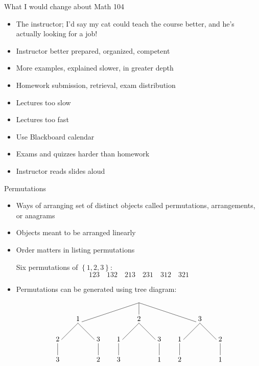 \documentclass[handout]{beamer}
\theoremstyle{definition}
\begin{document}
\begin{frame}{What I would change about Math 104}
\begin{itemize}
\item The instructor; I'd say my cat could teach the
course better, and he's actually looking for a job!
\item Instructor better prepared, organized, competent
\item More examples, explained slower, in greater depth
\item Homework submission, retrieval, exam distribution
\item Lectures too slow
\item Lectures too fast
\item Use Blackboard calendar
\item Exams and quizzes harder than homework
\item Instructor reads slides aloud
\end{itemize}
\end{frame}

\begin{frame}{Permutations}
\begin{itemize}
\item Ways of arranging set of distinct objects called
\alert{permutations}, \alert{arrangements}, or \alert{anagrams}
\item Objects meant to be arranged linearly
\item Order matters in listing permutations
\begin{example} Six permutations of $\left\{1,2,3\right\}$:
\[123\quad 132\quad 213\quad 231\quad 312\quad 321\]
\end{example}
\item Permutations can be generated using tree diagram:
\[\begin{xy}<1cm,0cm>:
(0,0)="0";
(-3,-1)="-31";
(0,-1)="01";
(3,-1)="31";
"0";"-31"*+!D{1}**\dir{-};
"0";"01"*+!D{2}**\dir{-};
"0";"31"*+!D{3}**\dir{-};
"-31";(-4,-2)*+!D{2}**\dir{-};
(-4,-3)*+!D{3}**\dir{-};
"-31";(-2,-2)*+!D{3}**\dir{-};
(-2,-3)*+!D{2}**\dir{-};
"01";(-1,-2)*+!D{1}**\dir{-};
(-1,-3)*+!D{3}**\dir{-};
"01";(1,-2)*+!D{3}**\dir{-};
(1,-3)*+!D{1}**\dir{-};
"31";(2,-2)*+!D{1}**\dir{-};
(2,-3)*+!D{2}**\dir{-};
"31";(4,-2)*+!D{2}**\dir{-};
(4,-3)*+!D{1}**\dir{-};
\end{xy}\]
\end{itemize}
\end{frame}
\end{document}
